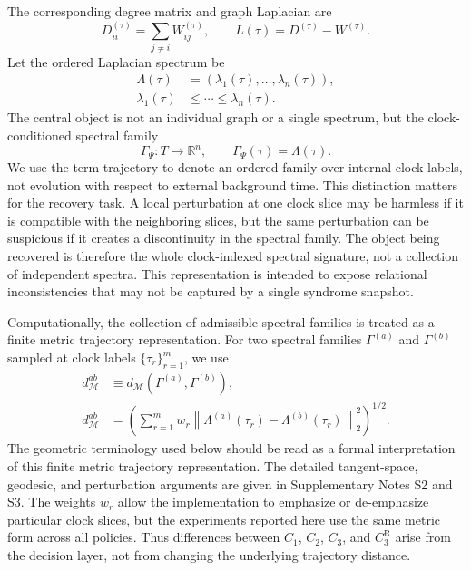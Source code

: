 \documentclass{iopjournal}
\begin{document}
The corresponding degree matrix and graph Laplacian are
\begin{equation}
D^{(\tau)}_{ii}=\sum_{j\neq i} W^{(\tau)}_{ij},
\qquad
L(\tau)=D^{(\tau)}-W^{(\tau)}.
\end{equation}
Let the ordered Laplacian spectrum be
\begin{equation}
\begin{aligned}
\Lambda(\tau)
&=
\left(\lambda_1(\tau),\ldots,\lambda_n(\tau)\right),\\
\lambda_1(\tau)
&\le
\cdots
\le
\lambda_n(\tau).
\end{aligned}
\end{equation}
The central object is not an individual graph or a single spectrum, but the
clock-conditioned spectral family
\begin{equation}
\Gamma_\Psi:T\rightarrow\mathbb{R}^{n},
\qquad
\Gamma_\Psi(\tau)=\Lambda(\tau).
\label{eq:spectral-family}
\end{equation}
We use the term trajectory to denote an ordered family over internal clock labels,
not evolution with respect to external background time.
This distinction matters for the recovery task. A local perturbation at one clock
slice may be harmless if it is compatible with the neighboring slices, but the same
perturbation can be suspicious if it creates a discontinuity in the spectral
family. The object being recovered is therefore the whole clock-indexed spectral
signature, not a collection of independent spectra. This representation is
intended to expose relational inconsistencies that may not be captured by a single
syndrome snapshot.

Computationally, the collection of admissible spectral families is treated as a
finite metric trajectory representation. For two spectral families
$\Gamma^{(a)}$ and $\Gamma^{(b)}$ sampled at clock labels
$\{\tau_r\}_{r=1}^{m}$, we use
\begin{equation}
\begin{aligned}
d_{\mathcal M}^{ab}
&\equiv
d_{\mathcal{M}}\!\left(\Gamma^{(a)},\Gamma^{(b)}\right),\\
d_{\mathcal M}^{ab}
&=
\left(
\sum_{r=1}^{m}
w_r
\left\|
\Lambda^{(a)}(\tau_r)-\Lambda^{(b)}(\tau_r)
\right\|_2^2
\right)^{1/2}.
\end{aligned}
\label{eq:trajectory-distance}
\end{equation}
The geometric terminology used below should be read as a formal interpretation of this finite metric trajectory representation. The detailed tangent-space,
geodesic, and perturbation arguments are given in Supplementary Notes S2 and S3.
The weights $w_r$ allow the implementation to emphasize or de-emphasize particular
clock slices, but the experiments reported here use the same metric form across
all policies. Thus differences between $C_1$, $C_2$, $C_3$, and
$C_3^{\mathrm R}$ arise from the decision layer, not from changing the underlying
trajectory distance.
\end{document}
